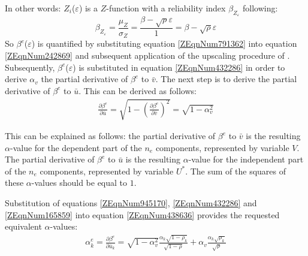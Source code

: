 {In other words: $Z_i$($\varepsilon$) is a $Z$-function with a reliability index $\beta_{Z_{\varepsilon}}$ following:
\begin{equation}
\beta_{Z_{\varepsilon}} = \frac{\mu_Z}{\sigma_Z} = \frac{\beta  - \sqrt \rho  \varepsilon }{1} = \beta  - \sqrt \rho  \varepsilon 
\end{equation}
So $\beta^e$($\varepsilon$) is quantified by substituting equation \eqref{ZEqnNum791362} into equation \eqref{ZEqnNum242869} and subsequent application of the upscaling procedure of .
Subsequently, $\beta^e$($\varepsilon$) is substituted in equation \eqref{ZEqnNum432286} in order to derive $\alpha_v$ the partial derivative of $\beta^e$ to $\bar{v}$.
The next step is to derive the partial derivative of $\beta^e$ to $\bar{u}$.
This can be derived as follows:
\begin{align}
\frac{\partial \beta ^{e} }{\partial \bar{u}} =\sqrt{1-\left(\frac{\partial \beta ^{e} }{\partial \bar{v}} \right)^{2} } =\sqrt{1-\alpha _{v}^{2} } \label{ZEqnNum165859} 
\end{align}

This can be explained as follows: the partial derivative of $\beta^e$ to $\bar{v}$ is the resulting $\alpha$-value for the dependent part of the $n_e$ components, represented by variable $V$.
The partial derivative of $\beta^e$ to $\bar{u}$ is the resulting $\alpha$-value for the independent part of the $n_e$ components, represented by variable $U^{*}$.
The sum of the squares of these $\alpha$-values should be equal to $1$. 

Substitution of equations \eqref{ZEqnNum945170}, \eqref{ZEqnNum432286} and \eqref{ZEqnNum165859} into equation \eqref{ZEqnNum438636} provides the requested equivalent $\alpha$-values:
\begin{align}
\alpha _{k}^{e} =\frac{\partial \beta ^{e} }{\partial \bar{u}_{k} } =\sqrt{1-\alpha _{v}^{2} } \frac{\alpha _{k} \sqrt{1-\rho _{k} } }{\sqrt{1-\rho } } +\alpha _{v} \frac{\alpha _{k} \sqrt{\rho _{k} } }{\sqrt{\rho } } \label{ZEqnNum998801} 
\end{align}

}
